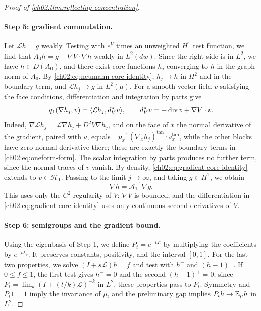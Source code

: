 \begin{proof}[Proof of \cref{ch02:thm:reflecting-concentration}]
\paragraph{Step 5: gradient commutation.} Let $\mathcal Lh=g$ weakly. Testing with $e^V$ times an unweighted $H^1$ test function, we find that $A_0h=g-\nabla V\cdot\nabla h$ weakly in $L^2(dw)$. Since the right side is in $L^2$, we have $h\in D(A_0)$, and there exist core functions $h_j$ converging to $h$ in the graph norm of $A_0$. By \eqref{ch02:eq:neumann-core-identity}, $h_j\to h$ in $H^2$ and in the boundary term, and $\mathcal Lh_j\to g$ in $L^2(\mu)$. For a smooth vector field $v$ satisfying the face conditions, differentiation and integration by parts give
\begin{equation}\label{ch02:eq:gradient-core-identity}
 q_1(\nabla h_j,v)=\langle \mathcal Lh_j,d_V^*v\rangle,\qquad d_V^*v=-\operatorname{div}v+\nabla V\cdot v.
\end{equation}
Indeed, $\nabla\mathcal Lh_j=\mathcal L\nabla h_j+D^2V\nabla h_j$, and on the face of $x$ the normal derivative of the gradient, paired with $v$, equals $-p_x^{-1}(\nabla_xh_j)^{\mathrm{tan}}\cdot v_x^{\mathrm{tan}}$, while the other blocks have zero normal derivative there; these are exactly the boundary terms in \eqref{ch02:eq:oneform-form}. The scalar integration by parts produces no further term, since the normal traces of $v$ vanish. By density, \eqref{ch02:eq:gradient-core-identity} extends to $v\in\mathcal H_1$. Passing to the limit $j\to\infty$, and taking $g\in H^1$, we obtain
\begin{equation}\label{ch02:eq:gradient-commutation}
 \nabla h=\mathcal A_1^{-1}\nabla g.
\end{equation}
This uses only the $C^2$ regularity of $V$: $\nabla V$ is bounded, and the differentiation in \eqref{ch02:eq:gradient-core-identity} uses only continuous second derivatives of $V$.

\paragraph{Step 6: semigroups and the gradient bound.} Using the eigenbasis of Step 1, we define $P_t=e^{-t\mathcal L}$ by multiplying the coefficients by $e^{-t\lambda_\nu}$. It preserves constants, positivity, and the interval $[0,1]$. For the last two properties, we solve $(I+s\mathcal L)h=f$ and test with $h^-$ and $(h-1)^+$. If $0\le f\le1$, the first test gives $h^-=0$ and the second $(h-1)^+=0$; since $P_t=\lim_k(I+(t/k)\mathcal L)^{-k}$ in $L^2$, these properties pass to $P_t$. Symmetry and $P_t1=1$ imply the invariance of $\mu$, and the preliminary gap implies $P_th\to\mathbb E_\mu h$ in $L^2$.


\end{proof}
